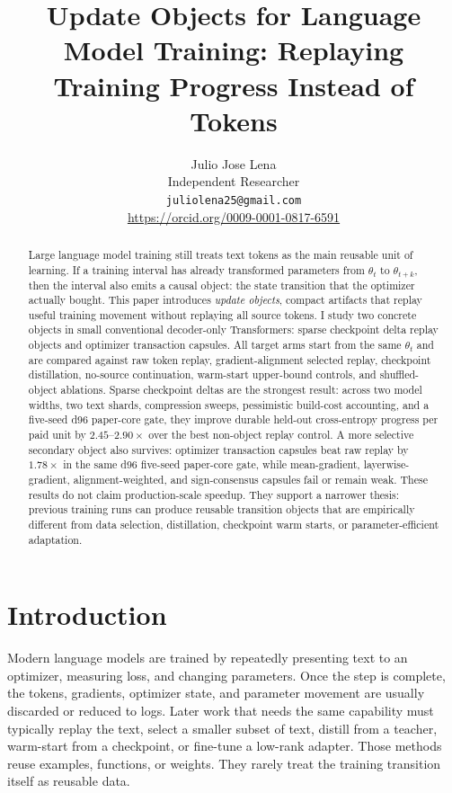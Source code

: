 \documentclass{article}
\title{Update Objects for Language Model Training: Replaying Training Progress Instead of Tokens}
\author{
  Julio Jose Lena \\
  Independent Researcher \\
  \texttt{juliolena25@gmail.com} \\
  \url{https://orcid.org/0009-0001-0817-6591}
}
\begin{document}
\maketitle

\begin{abstract}
Large language model training still treats text tokens as the main reusable
unit of learning. If a training interval has already transformed parameters
from $\theta_t$ to $\theta_{t+k}$, then the interval also emits a causal object:
the state transition that the optimizer actually bought. This paper introduces
\emph{update objects}, compact artifacts that replay useful training movement
without replaying all source tokens. I study two concrete objects in small
conventional decoder-only Transformers: sparse checkpoint delta replay objects
and optimizer transaction capsules. All target arms start from the same
$\theta_t$ and are compared against raw token replay, gradient-alignment
selected replay, checkpoint distillation, no-source continuation, warm-start
upper-bound controls, and shuffled-object ablations. Sparse checkpoint deltas
are the strongest result: across two model widths, two text shards, compression
sweeps, pessimistic build-cost accounting, and a five-seed d96 paper-core gate,
they improve durable held-out cross-entropy progress per paid unit by
$2.45$--$2.90\times$ over the best non-object replay control. A more selective
secondary object also survives: optimizer transaction capsules beat raw replay
by $1.78\times$ in the same d96 five-seed paper-core gate, while mean-gradient,
layerwise-gradient, alignment-weighted, and sign-consensus capsules fail or
remain weak. These results do not claim production-scale speedup. They support
a narrower thesis: previous training runs can produce reusable transition
objects that are empirically different from data selection, distillation,
checkpoint warm starts, or parameter-efficient adaptation.
\end{abstract}

\section{Introduction}

Modern language models are trained by repeatedly presenting text to an
optimizer, measuring loss, and changing parameters. Once the step is complete,
the tokens, gradients, optimizer state, and parameter movement are usually
discarded or reduced to logs. Later work that needs the same capability must
typically replay the text, select a smaller subset of text, distill from a
teacher, warm-start from a checkpoint, or fine-tune a low-rank adapter. Those
methods reuse examples, functions, or weights. They rarely treat the training
transition itself as reusable data.
\end{document}
